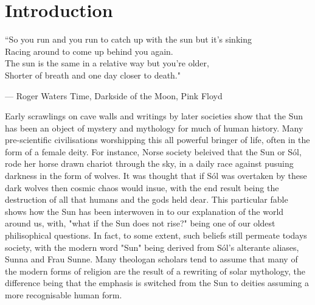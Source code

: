 

\section{Introduction}

\epigraphfontsize{\small\itshape}
\epigraph{``So you run and you run to catch up with the sun but it's sinking \\
Racing around to come up behind you again. \\
The sun is the same in a relative way but you're older, \\
Shorter of breath and one day closer to death."}{--- \textup{Roger Waters} Time, Darkside of the Moon, Pink Floyd}


Early scrawlings on cave walls and writings by later societies show that the Sun has been an object of mystery and mythology for much of human history. Many pre-scientific civilisations worshipping this all powerful bringer of life, often in the form of a female deity. For instance, Norse society beleived that the Sun or Sól, rode her horse drawn chariot through the sky, in a daily race against pusuing darkness in the form of wolves. It was thought that if Sól was overtaken by these dark wolves then cosmic chaos would insue, with the end result being the destruction of all that humans and the gods held dear. This particular fable shows how the Sun has been interwoven in to our explanation of the world around us, with, "what if the Sun does not rise?" being one of our oldest philisophical questions. In fact, to some extent, such beliefs still permeate todays society, with the modern word "Sun" being derived from Sól's alterante aliases, Sunna and Frau Sunne. Many theologan scholars tend to assume that many of the modern forms of religion are the result of a rewriting of solar mythology, the difference being that the emphasis is switched from the Sun to deities assuming a more recognisable human form.  


